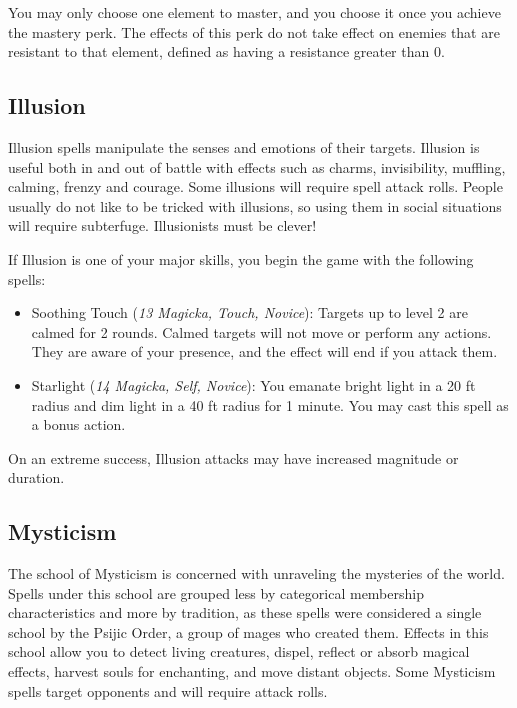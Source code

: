 \documentclass[12pt]{book}
\begin{document}
You may only choose one element to master, and you choose it once you achieve the mastery perk. The effects of this perk do not take effect on enemies that are resistant to that element, defined as having a resistance greater than 0.

\subsection{Illusion}

Illusion spells manipulate the senses and emotions of their targets. Illusion is useful both in and out of battle with effects such as charms, invisibility, muffling, calming, frenzy and courage. Some illusions will require spell attack rolls. People usually do not like to be tricked with illusions, so using them in social situations will require subterfuge. Illusionists must be clever!

If Illusion is one of your major skills, you begin the game with the following spells:
\begin{itemize}
	\item Soothing Touch (\textit{13 Magicka, Touch, Novice}): Targets up to level 2 are calmed for 2 rounds. Calmed targets will not move or perform any actions. They are aware of your presence, and the effect will end if you attack them.
	\item Starlight (\textit{14 Magicka, Self, Novice}): You emanate bright light in a 20 ft radius and dim light in a 40 ft radius for 1 minute. You may cast this spell as a bonus action.
\end{itemize}

On an extreme success, Illusion attacks may have increased magnitude or duration.

\subsection{Mysticism}

The school of Mysticism is concerned with unraveling the mysteries of the world. Spells under this school are grouped less by categorical membership characteristics and more by tradition, as these spells were considered a single school by the Psijic Order, a group of mages who created them. Effects in this school allow you to detect living creatures, dispel, reflect or absorb magical effects, harvest souls for enchanting, and move distant objects. Some Mysticism spells target opponents and will require attack rolls.
\end{document}
